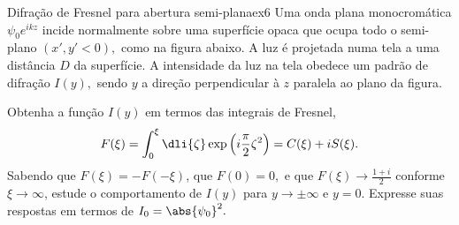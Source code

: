 \begin{exercício}{Difração de Fresnel para abertura semi-plana}{ex6}
    Uma onda plana monocromática \(\psi_0 e^{ikz}\) incide normalmente sobre uma superfície opaca que ocupa todo o semi-plano \((x', y' < 0),\) como na figura abaixo. A luz é projetada numa tela a uma distância \(D\) da superfície. A intensidade da luz na tela obedece um padrão de difração \(I(y),\) sendo \(y\) a direção perpendicular à \(z\) paralela ao plano da figura.
    \begin{center}
    \end{center}
    Obtenha a função \(I(y)\) em termos das integrais de Fresnel,
    \begin{equation*}
        F(\xi) = \int_0^\xi \dli{\zeta} \exp\left(i\frac{\pi}{2} \zeta^2\right) = C(\xi) + i S(\xi).
    \end{equation*}
    Sabendo que \(F(\xi) = - F(-\xi)\), que \(F(0) = 0,\) e que \(F(\xi) \to \frac{1 + i}{2}\) conforme \(\xi \to \infty\), estude o comportamento de \(I(y)\) para \(y \to \pm \infty\) e \(y = 0\). Expresse suas respostas em termos de \(I_0 = \abs{\psi_0}^2.\)
\end{exercício}
